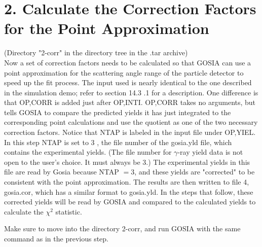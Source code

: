 \documentclass[10pt]{article}
\begin{document}
\section*{2. Calculate the Correction Factors for the Point Approximation}
(Directory "2-corr" in the directory tree in the .tar archive)\\
Now a set of correction factors needs to be calculated so that GOSIA can use a point approximation for the scattering angle range of the particle detector to speed up the fit process. The input used is nearly identical to the one described in the simulation demo; refer to section 14.3 .1 for a description. One difference is that OP,CORR is added just after OP,INTI. OP,CORR takes no arguments, but tells GOSIA to compare the predicted yields it has just integrated to the corresponding point calculations and use the quotient as one of the two necessary correction factors. Notice that NTAP is labeled in the input file under OP,YIEL. In this step NTAP is set to 3 , the file number of the gosia.yld file, which contains the experimental yields. (The file number for $\gamma$-ray yield data is not open to the user's choice. It must always be 3.) The experimental yields in this file are read by Gosia because NTAP $=3$, and these yields are "corrected" to be consistent with the point approximation. The results are then written to file 4, gosia.cor, which has a similar format to gosia.yld. In the steps that follow, these corrected yields will be read by GOSIA and compared to the calculated yields to calculate the $\chi^{2}$ statistic.

Make sure to move into the directory 2-corr, and run GOSIA with the same command as in the previous step.
\end{document}
